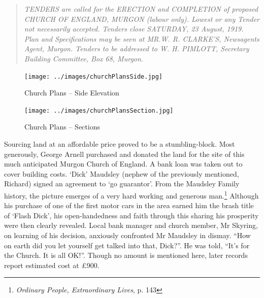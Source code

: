\begin{quote}

\emph{TENDERS are called for the ERECTION and COMPLETION of proposed CHURCH OF ENGLAND, MURGON (labour only). Lowest or any Tender not necessarily accepted. Tenders close SATURDAY, 23 August, 1919. Plan and Specifications may be seen at MR.W. R. CLARKE'S, Newsagents Agent, Murgon. Tenders to be addressed to W. H. PIMLOTT, Secretary Building Committee, Box 68, Murgon.}

\end{quote}









\begin{figure}
\begin{center}
\texttt{[image: ../images/churchPlansSide.jpg]}
\caption{Church Plans -- Side Elevation}
\end{center}
\end{figure}










\begin{figure}
\begin{center}
\texttt{[image: ../images/churchPlansSection.jpg]}
\caption{Church Plans -- Sections}
\end{center}
\end{figure}




Sourcing land at an affordable price proved to be a stumbling-block. Most generously, George Arnell purchased and donated the land for the site of this much anticipated Murgon Church of England. A bank loan was taken out to cover building costs. `Dick' Maudsley (nephew of the previously mentioned, Richard) signed an agreement to `go guarantor'. From the Maudsley Family history, the picture emerges of a very hard working and generous man.\footnote{\emph{Ordinary People, Extraordinary Lives}, p. 143} Although his purchase of one of the first motor cars in the area earned him the brash title of `Flash Dick', his open-handedness and faith through this sharing his prosperity were then clearly revealed. Local bank manager and church member, Mr Skyring, on learning of his decision, anxiously confronted Mr Maudsley in dismay. ``How on earth did you let yourself get talked into that, Dick?''. He was told, ``It's for the Church. It is all OK!''. Though no amount is mentioned here, later records report estimated cost at \pounds900.


